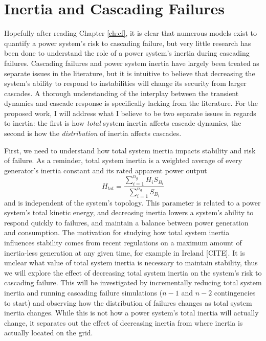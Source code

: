 \chapter{Inertia and Cascading Failures}

\label{ch:contribution}


Hopefully after reading Chapter \ref{ch:cf}, it is clear that numerous models exist to quantify a power system's risk to cascading failure, but very little research has been done to understand the role of a power system's inertia during cascading failures.  Cascading failures and power system inertia have largely been treated as separate issues in the literature, but it is intuitive to believe that decreasing the system's ability to respond to instabilities will change its security from larger cascades.  A thorough understanding of the interplay between the transient dynamics and cascade response is specifically lacking from the literature.  For the proposed work, I will address what I believe to be two separate issues in regards to inertia: the first is how \textit{total} system inertia affects cascade dynamics, the second is how the \textit{distribution} of inertia affects cascades.


First, we need to understand how total system inertia impacts stability and risk of failure.  As a reminder, total system inertia is a weighted average of every generator's inertia constant and its rated apparent power output $$ H_{tot} = \frac{\sum_{i=1}^{n_g} H_i S_{B_i}}{\sum_{i=1}^{n_g} S_{B_i}} $$ and is independent of the system's topology.  This parameter is related to a power system's total kinetic energy, and decreasing inertia lowers a system's ability to respond quickly to failures, and maintain a balance between power generation and consumption.  The motivation for studying how total system inertia influences stability comes from recent regulations on a maximum amount of inertia-less generation at any given time, for example in Ireland [CITE].  It is unclear what value of total system inertia is necessary to maintain stability, thus we will explore the effect of decreasing total system inertia on the system's risk to cascading failure.  This will be investigated by incrementally reducing total system inertia and running cascading failure simulations ($n-1$ and $n-2$ contingencies to start) and observing how the distribution of failures changes as total system inertia changes.  While this is not how a power system's total inertia will actually change, it separates out the effect of decreasing inertia from where inertia is actually located on the grid.

